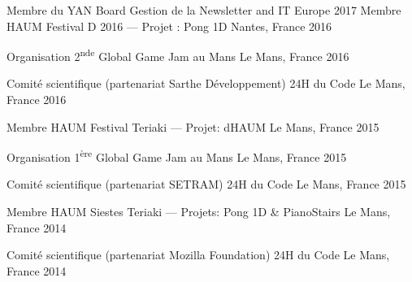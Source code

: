 

\begin{cvhonors}

  \cvhonor
		{Membre du YAN Board} %
		{Gestion de la Newsletter and IT} %
    {Europe} %
    {2017} %
  \cvhonor
		{Membre HAUM} %
		{Festival D 2016 --- Projet : Pong 1D} %
    {Nantes, France} %
    {2016} %

  \cvhonor
    {Organisation} %
		{2\textsuperscript{nde} Global Game Jam au Mans} %
    {Le Mans, France} %
    {2016} %

  \cvhonor
		{Comité scientifique (partenariat Sarthe Développement)} %
    {24H du Code} %
		{Le Mans, France} %
    {2016} %

  \cvhonor
		{Membre HAUM} %
    {Festival Teriaki --- Projet: dHAUM} %
		{Le Mans, France} %
    {2015} %

  \cvhonor
    {Organisation} %
		{1\textsuperscript{ère} Global Game Jam au Mans} %
    {Le Mans, France} %
    {2015} %

  \cvhonor
		{Comité scientifique (partenariat SETRAM)} %
    {24H du Code} %
		{Le Mans, France} %
    {2015} %

  \cvhonor
		{Membre HAUM} %
		{Siestes Teriaki --- Projets: Pong 1D \& PianoStairs} %
		{Le Mans, France} %
    {2014} %

  \cvhonor
		{Comité scientifique (partenariat Mozilla Foundation)} %
    {24H du Code} %
		{Le Mans, France} %
    {2014} %

\end{cvhonors}
